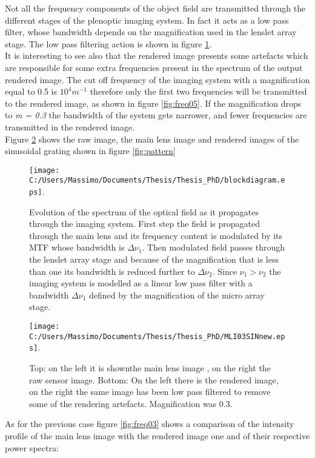 Not all the frequency components of the object field are transmitted through the different stages of the plenoptic imaging system. In fact it acts as a low pass filter, whose bandwidth depends on the magnification used in the lenslet array stage. The low pass filtering action is shown in figure \ref{fig:block}.
\\
  It is interesting to see also that the rendered image presents some artefacts which are responsible for some extra frequencies present in the spectrum of the output rendered image. The cut off frequency of the imaging system with a magnification equal to 0.5 is $10^4 m^{-1}$ therefore only the first two frequencies will be transmitted to the rendered image, as shown in figure \ref{fig:freq05}.
    If the magnification drops to \textit{m = 0.3} the bandwidth of the system gets narrower, and fewer frequencies are transmitted in the rendered image.
    \\
    Figure \ref{fig:image03} shows the raw image, the main lens image and rendered images of the sinusoidal grating shown in figure \ref{fig:pattern}
  \begin{figure}[H]
  	\centering
  	\texttt{[image: C:/Users/Massimo/Documents/Thesis/Thesis\_PhD/blockdiagram.eps]}.
  	\caption{\label{fig:block} Evolution of the spectrum of the optical field as it propagates through the imaging system. First step the field is propagated through the main lens and its frequency content is modulated by its MTF whose bandwidth is $\Delta \nu_1$. Then modulated field passes through the lenslet array stage and because of the magnification that is less than one its bandwidth is reduced further to $\Delta \nu_2$. Since $\nu_1 > \nu_2$  the imaging system is modelled as a linear low pass filter with a bandwidth $\Delta \nu_1$ defined by the magnification of the micro array stage. }
  \end{figure}
 \begin{figure}[H]
 	\centering
 	\texttt{[image: C:/Users/Massimo/Documents/Thesis/Thesis\_PhD/MLI03SINnew.eps]}.
 	\caption{\label{fig:image03} Top: on the left it is shownthe main lens image , on the right the raw sensor image. Bottom: On the left there is the  rendered image, on the right the same image has been low pass filtered to remove some of the rendering artefacts. Magnification was 0.3. }
 \end{figure}
As for the previous case figure \ref{fig:freq03} shows a comparison of the intensity profile of the main lens image with the rendered image one and of their respective power spectra: 
